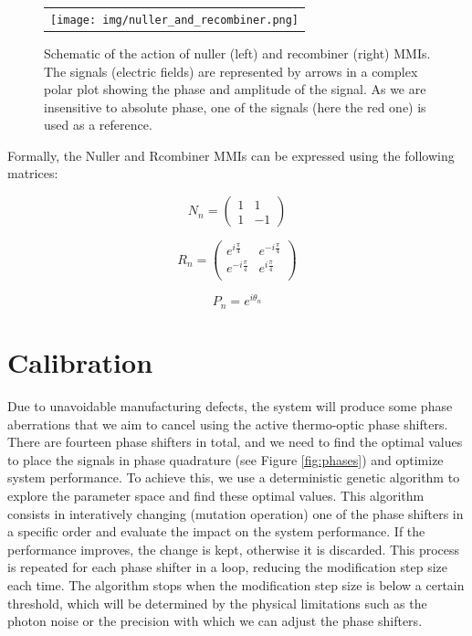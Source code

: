 \documentclass[]{spie}  %
\begin{document}
\begin{figure} [H]
    \begin{center}
    \begin{tabular}{c}
    \texttt{[image: img/nuller\_and\_recombiner.png]}
    \end{tabular}
    \end{center}
    \caption[nuller_and_recombiner] 
    { \label{fig:nuller_and_recombiner} 
    Schematic of the action of nuller (left) and recombiner (right) MMIs. The signals (electric fields) are represented by arrows in a complex polar plot showing the phase and amplitude of the signal. As we are insensitive to absolute phase, one of the signals (here the red one) is used as a reference.}
\end{figure}

Formally, the Nuller and Rcombiner MMIs can be expressed using the following matrices:

\begin{equation}\label{N}
    N_n =
    \begin{pmatrix}
        1 & 1 \\
        1 & -1
    \end{pmatrix}
\end{equation}

\begin{equation}\label{R}
    R_n =
    \begin{pmatrix}
        e^{i\frac{\pi}{4}} & e^{-i\frac{\pi}{4}} \\
        e^{-i\frac{\pi}{4}} & e^{i\frac{\pi}{4}} \\
    \end{pmatrix}
\end{equation}

\begin{equation}\label{P}
    P_n = e^{i\theta_n}
\end{equation}

\section{Calibration}

Due to unavoidable manufacturing defects, the system will produce some phase aberrations that we aim to cancel using the active thermo-optic phase shifters. There are fourteen phase shifters in total, and we need to find the optimal values to place the signals in phase quadrature (see Figure \ref{fig:phases}) and optimize system performance. To achieve this, we use a deterministic genetic algorithm to explore the parameter space and find these optimal values. This algorithm consists in interatively changing (mutation operation) one of the phase shifters in a specific order and evaluate the impact on the system performance. If the performance improves, the change is kept, otherwise it is discarded. This process is repeated for each phase shifter in a loop, reducing the modification step size each time. The algorithm stops when the modification step size is below a certain threshold, which will be determined by the physical limitations such as the photon noise or the precision with which we can adjust the phase shifters.
\end{document}
